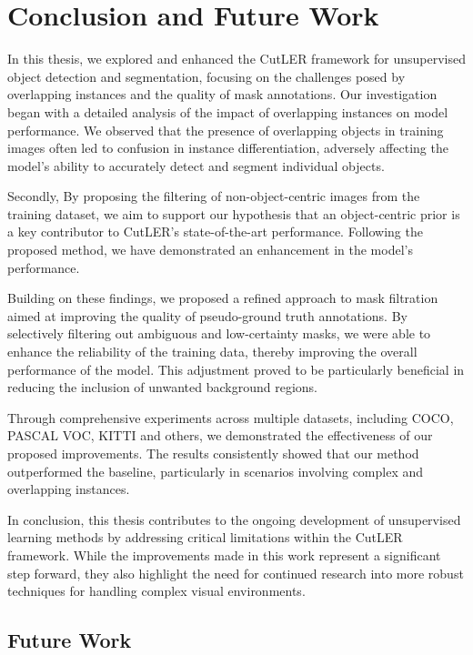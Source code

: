 \chapter{Conclusion and Future Work}\label{chap:conclusion}
In this thesis, we explored and enhanced the CutLER framework for unsupervised object detection and segmentation, focusing on the challenges posed by overlapping instances and the quality of mask annotations. Our investigation began with a detailed analysis of the impact of overlapping instances on model performance. We observed that the presence of overlapping objects in training images often led to confusion in instance differentiation, adversely affecting the model's ability to accurately detect and segment individual objects.

Secondly, By proposing the filtering of non-object-centric images from the training dataset, we aim to support our hypothesis that an object-centric prior is a key contributor to CutLER's state-of-the-art performance. Following the proposed method, we have demonstrated an enhancement in the model's performance.

Building on these findings, we proposed a refined approach to mask filtration aimed at improving the quality of pseudo-ground truth annotations. By selectively filtering out ambiguous and low-certainty masks, we were able to enhance the reliability of the training data, thereby improving the overall performance of the model. This adjustment proved to be particularly beneficial in reducing the inclusion of unwanted background regions.

Through comprehensive experiments across multiple datasets, including COCO, PASCAL VOC, KITTI and others, we demonstrated the effectiveness of our proposed improvements. The results consistently showed that our method outperformed the baseline, particularly in scenarios involving complex and overlapping instances.

In conclusion, this thesis contributes to the ongoing development of unsupervised learning methods by addressing critical limitations within the CutLER framework. While the improvements made in this work represent a significant step forward, they also highlight the need for continued research into more robust techniques for handling complex visual environments.

\section{Future Work}
